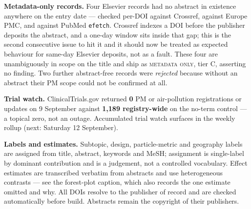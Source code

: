 \documentclass[10pt]{article}
\begin{document}
\begin{keybox}
{\vspace{0.8mm}
\textbf{Metadata-only records.} Four Elsevier records had no abstract in existence anywhere
on the entry date --- checked per-DOI against Crossref, against Europe PMC, and against
PubMed \texttt{efetch}. Crossref indexes a DOI before the publisher deposits the abstract,
and a one-day window sits inside that gap; this is the second consecutive issue to hit it
and it should now be treated as expected behaviour for same-day Elsevier deposits, not as
a fault. These four are unambiguously in scope on the title and ship as \textsc{metadata
only}, tier C, asserting no finding. Two further abstract-free records were \emph{rejected}
because without an abstract their PM scope could not be confirmed at all.\par
\vspace{0.8mm}
\textbf{Trial watch.} ClinicalTrials.gov returned \textbf{0} PM or air-pollution
registrations or updates on 9 September against \textbf{1{,}189 registry-wide} on the
no-term control --- a topical zero, not an outage. Accumulated trial watch surfaces in the
weekly rollup (next: Saturday 12 September).\par
\vspace{0.8mm}
\textbf{Labels and estimates.} Subtopic, design, particle-metric and geography labels are
assigned from title, abstract, keywords and MeSH; assignment is single-label by dominant
contribution and is a judgement, not a controlled vocabulary. Effect estimates are
transcribed verbatim from abstracts and use heterogeneous contrasts --- see the forest-plot
caption, which also records the one estimate omitted and why. All DOIs resolve to the
publisher of record and are checked automatically before build. Abstracts remain the
copyright of their publishers.\par}
\end{keybox}
\end{document}
